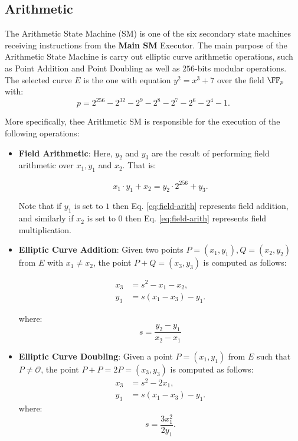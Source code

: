 \subsection{Arithmetic} \label{sec:arith-sm}


The Arithmetic State Machine (SM) is one of the six secondary state machines receiving instructions from the \textbf{Main SM} Executor. The main purpose of the Arithmetic State Machine is carry out elliptic curve arithmetic operations, such as Point Addition and Point Doubling as well as $256$-bits modular operations. The selected curve $E$ is the one with equation $y^2 = x^3 + 7$ over the field $\FF_p$ with:
\[
p = 2^{256} - 2^{32} - 2^9 - 2^8 - 2^7 - 2^6 - 2^4 - 1.
\] 

More specifically, thee Arithmetic SM is responsible for the execution of the following operations:

\begin{itemize}
    
    \item \textbf{Field Arithmetic}:  Here, $y_2$ and $y_3$ are the result of performing field arithmetic over $x_1,y_1$ and $x_2$. That is:
    
    \begin{equation}
        x_1 \cdot y_1 + x_2 = y_2 \cdot 2^{256} + y_3. \label{eq:field-arith}
    \end{equation}
    
    Note that if $y_1$ is set to $1$ then Eq. \eqref{eq:field-arith} represents field addition, and similarly if $x_2$ is set to $0$ then Eq. \eqref{eq:field-arith} represents field multiplication.
    
    \item \textbf{Elliptic Curve Addition}: Given two points $P = (x_1,y_1), Q = (x_2,y_2)$ from $E$ with $x_1 \neq x_2$, the point $P+Q = (x_3,y_3)$ is computed as follows:
    
    \begin{align*}
        x_3 &= s^2 - x_1 - x_2, \\
        y_3 &= s (x_1 - x_3) - y_1.
    \end{align*}
    
    where:
    \[
    s = \frac{y_2 - y_1}{x_2 - x_1}
    \]
    
    \item \textbf{Elliptic Curve Doubling}: Given a point $P = (x_1,y_1)$ from $E$ such that $P \neq \mathcal{O}$, the point $P+P = 2P = (x_3,y_3)$ is computed as follows:
    \begin{align*}
        x_3 &= s^2 - 2x_1, \\
        y_3 &= s (x_1 - x_3) - y_1.
    \end{align*}
    where:
    \[
    s = \frac{3x_1^2}{2y_1}.
    \]
    
\end{itemize}

